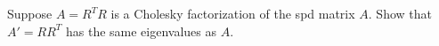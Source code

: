 \documentclass[12pt, leqno]{article}
\begin{document}

Suppose $A = R^T R$ is a Cholesky factorization of the spd matrix $A$.  
Show that $A' = RR^T$ has the same eigenvalues as $A$.
\end{document}
